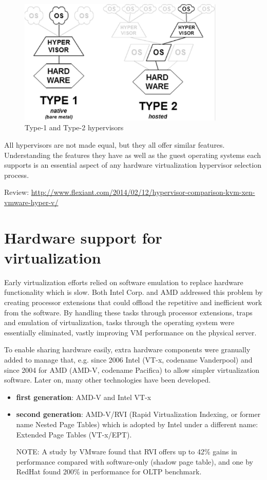 \begin{figure}[hbt]
  \centerline{\includegraphics[height=6cm,
    angle=0]{./images/Hypervisor.eps}}
\caption{Type-1 and Type-2 hypervisors}
\label{fig:Hypervisor}
\end{figure}

All hypervisors are not made equal, but they all offer similar features.
Understanding the features they have as well as the guest operating systems each
supports is an essential aspect of any hardware virtualization hypervisor
selection process.

 Review:
\url{http://www.flexiant.com/2014/02/12/hypervisor-comparison-kvm-xen-vmware-hyper-v/}

\section{Hardware support for virtualization}
\label{sec:virtualization_hardware}


Early virtualization efforts relied on software emulation to replace hardware
functionality which is slow. Both Intel Corp. and AMD addressed this problem by
creating processor extensions that could offload the repetitive and inefficient
work from the software. By handling these tasks through processor extensions,
traps and emulation of virtualization, tasks through the operating system were
essentially eliminated, vastly improving VM performance on the physical server.


To enable sharing hardware easily, extra hardware components were granually
added to manage that, e.g. since 2006 Intel (VT-x, codename Vanderpool) and
since 2004 for AMD (AMD-V, codename Pacifica) to allow simpler virtualization
software. Later on, many other technologies have been developed.

\begin{itemize}
  
  \item {\bf first generation}: AMD-V and Intel VT-x
  
  \item {\bf second generation}: AMD-V/RVI (Rapid Virtualization Indexing, or
  former name Nested Page Tables) which is adopted by Intel under a different name:
  Extended Page Tables (VT-x/EPT).
  
NOTE: A study by VMware found that RVI offers up to 42\% gains in performance
compared with software-only (shadow page table), and one by RedHat found 200\%
in performance for OLTP benchmark.
   
\end{itemize}

